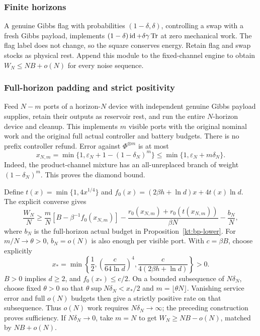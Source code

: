 \subsubsection{Finite horizons}
A genuine Gibbs flag with probabilities $(1-\delta,\delta)$,
controlling a swap with a fresh Gibbs payload, implements
$(1-\delta)\operatorname{id}+\delta\gamma\operatorname{Tr}$ at zero mechanical work.
The flag label does not change, so the square conserves energy.
Retain flag and swap stocks as physical rest. Append this module
to the fixed-channel engine to obtain $W_N\le NB+o(N)$ for every
noise sequence.

\subsubsection{Full-horizon padding and strict positivity}
Feed $N-m$ ports of a horizon-$N$ device with independent genuine
Gibbs payload supplies, retain their outputs as reservoir rest, and
run the entire $N$-horizon device and cleanup.
This implements $m$ visible ports with the original nominal work
and the original full actual controller and battery budgets.
There is no prefix controller refund.
Error against $\Phi^{\otimes m}$ is at most
\[
 x_{N,m}=\min\{1,\varepsilon_N+1-(1-\delta_N)^m\}
       \le\min\{1,\varepsilon_N+m\delta_N\}.
\]
Indeed, the product-channel mixture has an all-unreplaced branch
of weight $(1-\delta_N)^m$. This proves the diamond bound.

Define $t(x)=\min\{1,4x^{1/4}\}$ and
$f_0(x)=(2\beta h+\ln d)x+4t(x)\ln d$.
The explicit converse gives
\begin{equation}\label{kt:bp-padding}
 \frac{W_N}{N}\ge\frac mN[B-\beta^{-1}f_0(x_{N,m})]
 -\frac{r_0(x_{N,m})+r_0(t(x_{N,m}))}{\beta N}
 -\frac{b_N}{N},
\end{equation}
where $b_N$ is the full-horizon actual budget in Proposition~\ref{kt:bp-lower}.
For $m/N\to\theta>0$, $b_N=o(N)$ is also enough per visible port.
With $c=\beta B$, choose explicitly
\[
 x_*=\min\left\{\frac12,
       \left(\frac{c}{64\ln d}\right)^4,
       \frac{c}{4(2\beta h+\ln d)}\right\}>0.
\]
$B>0$ implies $d\ge2$, and $f_0(x_*)\le c/2$.
On a bounded subsequence of $N\delta_N$, choose fixed $\theta>0$
so that $\theta\sup N\delta_N<x_*/2$ and $m=\lfloor\theta N\rfloor$.
Vanishing service error and full $o(N)$ budgets then give a strictly
positive rate on that subsequence.
Thus $o(N)$ work requires $N\delta_N\to\infty$; the preceding
construction proves sufficiency.
If $N\delta_N\to0$, take $m=N$ to get $W_N\ge NB-o(N)$,
matched by $NB+o(N)$.

